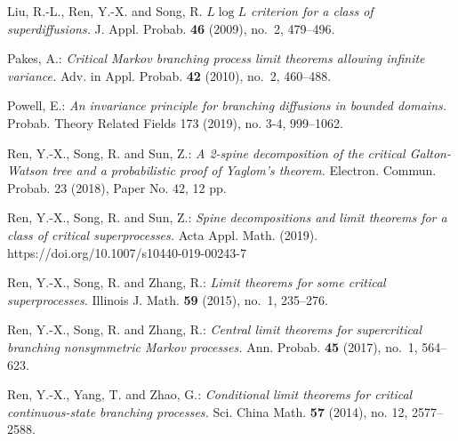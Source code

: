\documentclass[12pt,a4paper]{amsart}
\def\MR#1{\href{http://www.ams.org/mathscinet-getitem?mr=#1}{MR-#1}}
\def\ARXIV#1{\href{https://arxiv.org/abs/#1}{arXiv:#1}}
\theoremstyle{definition}
\numberwithin{equation}{section}
\begin{document}
\begin{thebibliography}{10}
  Liu, R.-L., Ren, Y.-X. and Song, R.
	\emph{{$L\log L$} criterion for a class of superdiffusions.}
	J. Appl. Probab. \textbf{46} (2009), no.~2, 479--496.
	
	Pakes, A.:
	\emph{Critical {M}arkov branching process limit theorems allowing infinite variance.}
	Adv. in Appl. Probab. \textbf{42} (2010), no.~2, 460--488.
	
  Powell, E.:
  \emph{An invariance principle for branching diffusions in bounded domains.} 
  Probab. Theory Related Fields 173 (2019), no. 3-4, 999–1062.

	
  Ren, Y.-X., Song, R. and Sun, Z.:
  \emph{A 2-spine decomposition of the critical Galton-Watson tree and a probabilistic proof of Yaglom's theorem.} 
  Electron. Commun. Probab. 23 (2018), Paper No. 42, 12 pp. 

	
  Ren, Y.-X., Song, R. and Sun, Z.: 
  \emph{Spine decompositions and limit theorems for a class of critical superprocesses.}
  Acta Appl. Math. (2019). https://doi.org/10.1007/s10440-019-00243-7

	
	Ren, Y.-X., Song, R. and Zhang, R.:
  \emph{Limit theorems for some critical superprocesses.}
	Illinois J. Math. \textbf{59} (2015), no.~1, 235--276.
	
	Ren, Y.-X., Song, R. and Zhang, R.:
	\emph{Central limit theorems for supercritical branching nonsymmetric {M}arkov processes.}
	Ann. Probab. \textbf{45} (2017), no.~1, 564--623.
	
	Ren, Y.-X., Yang, T. and Zhao, G.:
	\emph{Conditional limit theorems for critical continuous-state branching processes.}
	Sci. China Math. \textbf{57} (2014), no. 12, 2577–2588.
	

\end{thebibliography}
\end{document}
